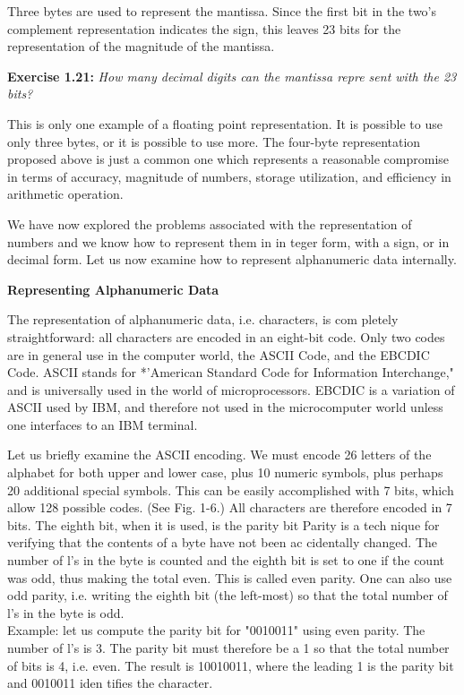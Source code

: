 \documentclass[12pt]{book}
\begin{document}
Three bytes are used to represent the mantissa. Since the first bit in the two's complement representation indicates the sign, this leaves 23 bits for the representation of the magnitude of the mantissa.

\noindent\textbf{Exercise 1.21:} \textit{How many decimal digits can the mantissa repre sent with the 23 bits?}

This is only one example of a floating point representation. It is possible to use only three bytes, or it is possible to use more. The four-byte representation proposed above is just a common one which represents a reasonable compromise in terms of accuracy, magnitude of numbers, storage utilization, and efficiency in arithmetic operation.

We have now explored the problems associated with the representation of numbers and we know how to represent them in in teger form, with a sign, or in decimal form. Let us now examine how to represent alphanumeric data internally.

\noindent\textbf{Representing Alphanumeric Data}

The representation of alphanumeric data, i.e. characters, is com
pletely straightforward: all characters are encoded in an eight-bit
code. Only two codes are in general use in the computer world, the
ASCII Code, and the EBCDIC Code. ASCII stands for *'American
Standard Code for Information Interchange," and is universally
used in the world of microprocessors. EBCDIC is a variation of
ASCII used by IBM, and therefore not used in the microcomputer
world unless one interfaces to an IBM terminal.

Let us briefly examine the ASCII encoding. We must encode 26
letters of the alphabet for both upper and lower case, plus 10
numeric symbols, plus perhaps 20 additional special symbols. This
can be easily accomplished with 7 bits, which allow 128 possible
codes. (See Fig. 1-6.) All characters are therefore encoded in 7 bits.
The eighth bit, when it is used, is the parity bit Parity is a tech
nique for verifying that the contents of a byte have not been ac
cidentally changed. The number of l's in the byte is counted and
the eighth bit is set to one if the count was odd, thus making the
total even. This is called even parity. One can also use odd parity,
i.e. writing the eighth bit (the left-most) so that the total number of
l's in the byte is odd.\\

Example: let us compute the parity bit for "0010011" using even
parity. The number of l's is 3. The parity bit must therefore be a 1
so that the total number of bits is 4, i.e. even. The result is
10010011, where the leading 1 is the parity bit and 0010011 iden
tifies the character.
\end{document}
